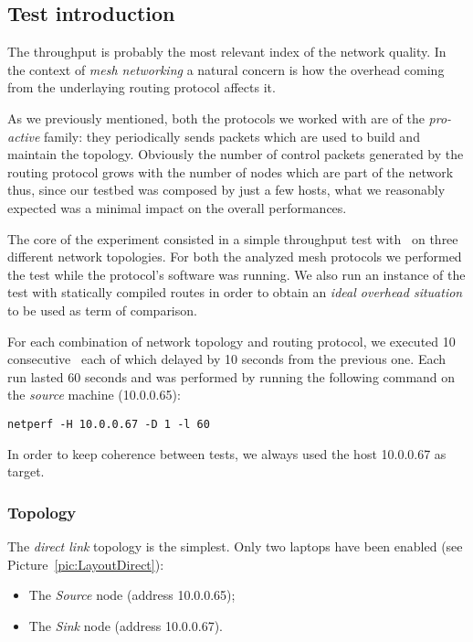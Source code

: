 \subsection{Test introduction}

    The throughput is probably the most relevant index of the network
    quality. In the context of \emph{mesh networking} a natural concern is
    how the overhead coming from the underlaying routing protocol affects
    it.

    As we previously mentioned, both the protocols we worked
    with are of the \emph{pro-active} family: they periodically sends
    packets which are used to build and maintain the topology. Obviously
    the number of control packets generated by the routing protocol grows
    with the number of nodes which are part of the network thus, since our
    testbed was composed by just a few hosts, what we reasonably expected
    was a minimal impact on the overall performances.

    The core of the experiment consisted in a simple throughput test with
    \netperf\ on three different network topologies. For both the
    analyzed mesh protocols we performed the test while the protocol's
    software was running. We also run an instance of the test with
    statically compiled routes in order to obtain an \emph{ideal overhead
    situation} to be used as term of comparison.

    For each combination of network topology and routing protocol, we
    executed 10 consecutive \netperf\ each of which delayed by 10 seconds
    from the previous one. Each run lasted 60 seconds and was performed by
    running the following command on the \emph{source} machine (10.0.0.65):
\begin{verbatim}
netperf -H 10.0.0.67 -D 1 -l 60
\end{verbatim}

    In order to keep coherence between tests, we always used the host
    10.0.0.67 as target.

    \subsubsection{Topology}

        The \emph{direct link} topology is the simplest. Only two laptops
        have been enabled (see Picture~\ref{pic:LayoutDirect}):
        \begin{itemize}
        \item   The \emph{Source} node (address 10.0.0.65);
        \item   The \emph{Sink} node (address 10.0.0.67).
        \end{itemize}

